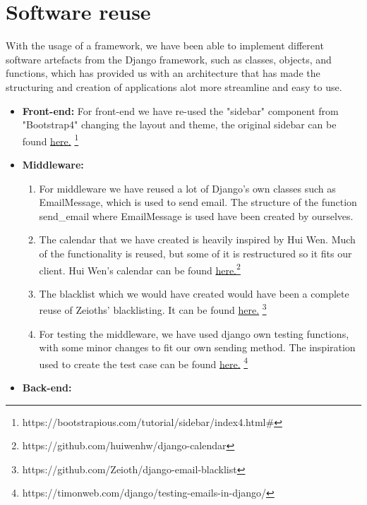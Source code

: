 \documentclass{article}
\begin{document}
\section*{Software reuse}

With the usage of a framework, we have been able to implement different software artefacts from the Django framework, such as classes, objects, and functions, which has provided us with an architecture that has made the structuring and creation of applications alot more streamline and easy to use. 
\begin{itemize}

    
    \item \textbf{Front-end:} For front-end we have re-used the "sidebar" component from "Bootstrap4" changing the layout and theme, the original sidebar can be found \href{https://bootstrapious.com/tutorial/sidebar/index4.html#}{here.} \footnote{https://bootstrapious.com/tutorial/sidebar/index4.html#}
    \item \textbf{Middleware: } 
    \begin{enumerate}
        \item For middleware we have reused a lot of Django's own classes such as EmailMessage, which is used to send email. The structure of the function send\_email where EmailMessage is used have been created by ourselves.
        \item The calendar that we have created is heavily inspired by Hui Wen. Much of the functionality is reused, but some of it is restructured so it fits our client. Hui Wen's calendar can be found \href{https://github.com/huiwenhw/django-calendar}{here.}\footnote{https://github.com/huiwenhw/django-calendar} 
        \item The blacklist which we would have created would have been a complete reuse of Zeioths' blacklisting. It can be found \href{https://github.com/Zeioth/django-email-blacklist}{here.} \footnote{https://github.com/Zeioth/django-email-blacklist}
        \item For testing the middleware, we have used django own testing functions, with some minor changes to fit our own sending method. The inspiration used to create the test case can be found \href{https://timonweb.com/django/testing-emails-in-django/}{here.} \footnote{https://timonweb.com/django/testing-emails-in-django/}
        \end{enumerate}
    \item \textbf{Back-end: } 
    \begin{enumerate}

\end{enumerate}
\end{itemize}
\end{document}
